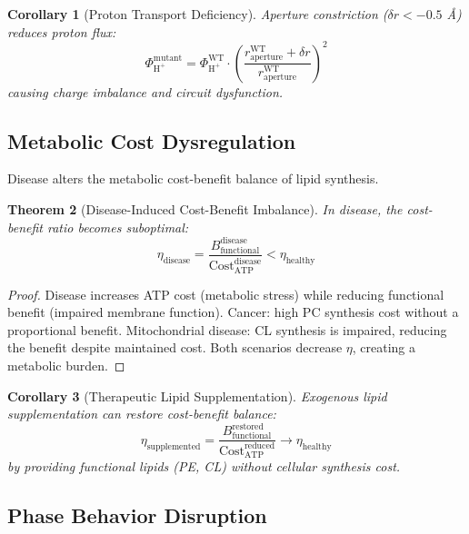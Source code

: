 \documentclass[11pt,twocolumn,a4paper]{article}
\newtheorem{theorem}{Theorem}[section]
\newtheorem{corollary}[theorem]{Corollary}
\theoremstyle{definition}
\theoremstyle{remark}
\begin{document}
\begin{corollary}[Proton Transport Deficiency]
\label{cor:proton_deficiency}
Aperture constriction ($\delta r < -0.5$ \AA) reduces proton flux:
\begin{equation}
\Phi_{\text{H}^+}^{\text{mutant}} = \Phi_{\text{H}^+}^{\text{WT}} \cdot \left(\frac{r_{\text{aperture}}^{\text{WT}} + \delta r}{r_{\text{aperture}}^{\text{WT}}}\right)^2
\end{equation}
causing charge imbalance and circuit dysfunction.
\end{corollary}

\subsection{Metabolic Cost Dysregulation}

Disease alters the metabolic cost-benefit balance of lipid synthesis.

\begin{theorem}[Disease-Induced Cost-Benefit Imbalance]
\label{thm:disease_cost_benefit}
In disease, the cost-benefit ratio becomes suboptimal:
\begin{equation}
\eta_{\text{disease}} = \frac{B_{\text{functional}}^{\text{disease}}}{\text{Cost}_{\text{ATP}}^{\text{disease}}} < \eta_{\text{healthy}}
\end{equation}
\end{theorem}

\begin{proof}
Disease increases ATP cost (metabolic stress) while reducing functional benefit (impaired membrane function). Cancer: high PC synthesis cost without a proportional benefit. Mitochondrial disease: CL synthesis is impaired, reducing the benefit despite maintained cost. Both scenarios decrease $\eta$, creating a metabolic burden.
\end{proof}

\begin{corollary}[Therapeutic Lipid Supplementation]
\label{cor:therapeutic_lipid}
Exogenous lipid supplementation can restore cost-benefit balance:
\begin{equation}
\eta_{\text{supplemented}} = \frac{B_{\text{functional}}^{\text{restored}}}{\text{Cost}_{\text{ATP}}^{\text{reduced}}} \to \eta_{\text{healthy}}
\end{equation}
by providing functional lipids (PE, CL) without cellular synthesis cost.
\end{corollary}

\subsection{Phase Behavior Disruption}
\end{document}
